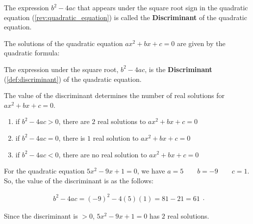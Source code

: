 \begin{review}
\end{review}

\begin{definition}[Discriminant]
  \label{def:discriminant}

  The expression $b^{2} - 4ac$ that appears under the square root sign in the
  quadratic equation (\ref{rev:quadratic_equation}) is called the
  \textbf{Discriminant} of the quadratic equation.
\end{definition}

The solutions of the quadratic equation $ax^{2} + bx + c = 0$ are given by the
quadratic formula:

The expression under the square root, $b^{2} - 4ac$, is the
\textbf{Discriminant} (\ref{def:discriminant}) of the quadratic equation.

The value of the discriminant determines the number of real solutions for
$ax^{2} + bx + c = 0$.

\begin{enumerate}
  \label{enum:number_of_real_solutions}

  \item if $b^{2} - 4ac > 0$, there are $2$ real solutions to
    $ax^{2} + bx + c = 0$
  \item if $b^{2} - 4ac = 0$, there is $1$ real solution to
    $ax^{2} + bx + c = 0$
  \item if $b^{2} - 4ac < 0$, there are no real solution to
    $ax^{2} + bx + c = 0$
\end{enumerate}

\begin{example}
  \label{exm:find_discriminant}

  For the quadratic equation $5x^{2} - 9x + 1 = 0$, we have
  $a = 5 \qquad b = -9 \qquad c = 1$. So, the value of the discriminant is as
  the follows:

  \begin{equation}
    \label{eqt:find_discriminant}
    \begin{split}
      b^{2} - 4ac = (-9)^{2} - 4(5)(1) = 81 - 21 = 61
    \end{split}
  .\end{equation}

  Since the discriminant is $> 0$, $5x^{2} - 9x + 1 = 0$ has $2$ real solutions.
\end{example}

\newpage
